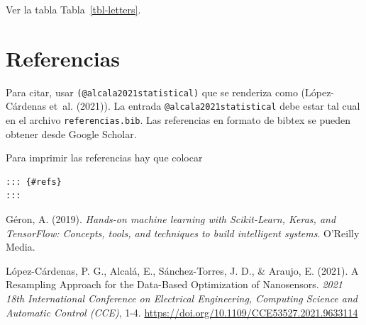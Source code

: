 \documentclass[
  letterpaper,
  DIV=11,
  numbers=noendperiod]{scrartcl}
\newlength{\cslhangindent}
\newlength{\cslentryspacingunit} %
\newenvironment{CSLReferences}[2] %
 {%
  \setlength{\parindent}{0pt}
  \ifodd #1
  \let\oldpar\par
  \def\par{\hangindent=\cslhangindent\oldpar}
  \fi
  \setlength{\parskip}{#2\cslentryspacingunit}
 }%
 {}
\begin{document}
Ver la tabla Tabla~\ref{tbl-letters}.

\hypertarget{referencias}{%
\section{Referencias}\label{referencias}}

Para citar, usar \texttt{(@alcala2021statistical)} que se renderiza como
(López-Cárdenas et~al. (2021)). La entrada
\texttt{@alcala2021statistical} debe estar tal cual en el archivo
\texttt{referencias.bib}. Las referencias en formato de bibtex se pueden
obtener desde Google Scholar.

Para imprimir las referencias hay que colocar

\begin{verbatim}
::: {#refs}
:::
\end{verbatim}

\hypertarget{refs}{}
\begin{CSLReferences}{1}{0}
\leavevmode{}%
Géron, A. (2019). \emph{Hands-on machine learning with Scikit-Learn,
Keras, and TensorFlow: Concepts, tools, and techniques to build
intelligent systems}. O'Reilly Media.

\leavevmode{}%
López-Cárdenas, P. G., Alcalá, E., Sánchez-Torres, J. D., \& Araujo, E.
(2021). A Resampling Approach for the Data-Based Optimization of
Nanosensors. \emph{2021 18th International Conference on Electrical
Engineering, Computing Science and Automatic Control (CCE)}, 1-4.
\url{https://doi.org/10.1109/CCE53527.2021.9633114}

\end{CSLReferences}
\end{document}
